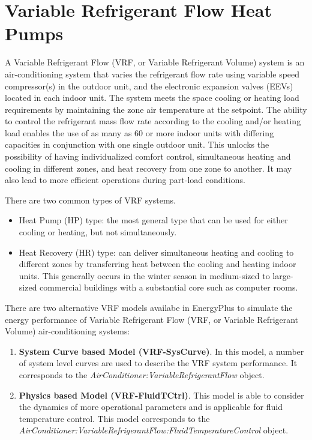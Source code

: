\section{Variable Refrigerant Flow Heat Pumps }\label{variable-refrigerant-flow-heat-pumps}

A Variable Refrigerant Flow (VRF, or Variable Refrigerant Volume) system is an air-conditioning system that varies the refrigerant flow rate using variable speed compressor(s) in the outdoor unit, and the electronic expansion valves (EEVs) located in each indoor unit. The system meets the space cooling or heating load requirements by maintaining the zone air temperature at the setpoint. The ability to control the refrigerant mass flow rate according to the cooling and/or heating load enables the use of as many as 60 or more indoor units with differing capacities in conjunction with one single outdoor unit. This unlocks the possibility of having individualized comfort control, simultaneous heating and cooling in different zones, and heat recovery from one zone to another. It may also lead to more efficient operations during part-load conditions.

There are two common types of VRF systems.

\begin{itemize}
\item
  Heat Pump (HP) type: the most general type that can be used for either cooling or heating, but not simultaneously.
\item
  Heat Recovery (HR) type: can deliver simultaneous heating and cooling to different zones by transferring heat between the cooling and heating indoor units. This generally occurs in the winter season in medium-sized to large-sized commercial buildings with a substantial core such as computer rooms.
\end{itemize}

There are two alternative VRF models availabe in EnergyPlus to simulate the energy performance of Variable Refrigerant Flow (VRF, or Variable Refrigerant Volume) air-conditioning systems:

\begin{enumerate}
\def\labelenumi{\arabic{enumi}.}
\item
  \textbf{System Curve based Model (VRF-SysCurve)}. In this model, a number of system level curves are used to describe the VRF system performance. It corresponds to the \emph{AirConditioner:VariableRefrigerantFlow} object.
\item
  \textbf{Physics based Model (VRF-FluidTCtrl)}. This model is able to consider the dynamics of more operational parameters and is applicable for fluid temperature control. This model corresponds to the \emph{AirConditioner:VariableRefrigerantFlow:FluidTemperatureControl} object.
\end{enumerate}

